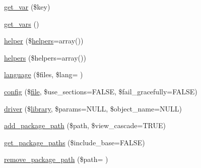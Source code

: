 \begin{DoxyCompactItemize}
\item 
\hyperlink{class_c_i___loader_a06567b423ba6d5b852808e581ef00fb0}{get\+\_\+var} (\$key)
\item 
\hyperlink{class_c_i___loader_aff8505856d4aa461fcb3c0207d6a238f}{get\+\_\+vars} ()
\item 
\hyperlink{class_c_i___loader_a2da00ff269596262b62c0c6032b2996f}{helper} (\$\hyperlink{class_c_i___loader_a2c39d50f31ce66ffe936e4f68219e275}{helpers}=array())
\item 
\hyperlink{class_c_i___loader_a2c39d50f31ce66ffe936e4f68219e275}{helpers} (\$helpers=array())
\item 
\hyperlink{class_c_i___loader_ad7340a297d0f18659129251f8cbada65}{language} (\$files, \$lang= \textquotesingle{}\textquotesingle{})
\item 
\hyperlink{class_c_i___loader_af54799dcb5bf2f7346b5d2a7d824a471}{config} (\$\hyperlink{class_c_i___loader_a47e4b8eda2bbf9e8bb505cdafb8e4ba5}{file}, \$use\+\_\+sections=F\+A\+L\+S\+E, \$fail\+\_\+gracefully=F\+A\+L\+S\+E)
\item 
\hyperlink{class_c_i___loader_ad7ea86a4ca078b6419c7d04827db700b}{driver} (\$\hyperlink{class_c_i___loader_a03207e0bcf58b6c9ecbc09fd2d8eab5d}{library}, \$params=N\+U\+L\+L, \$object\+\_\+name=N\+U\+L\+L)
\item 
\hyperlink{class_c_i___loader_a8b23f3be0a84aa31df8b715ca841f5cf}{add\+\_\+package\+\_\+path} (\$path, \$view\+\_\+cascade=T\+R\+U\+E)
\item 
\hyperlink{class_c_i___loader_a645d5b65ec991d936d864e8af01485e7}{get\+\_\+package\+\_\+paths} (\$include\+\_\+base=F\+A\+L\+S\+E)
\item 
\hyperlink{class_c_i___loader_a9c8ee8f552fff6f4619381ed8f3cec62}{remove\+\_\+package\+\_\+path} (\$path= \textquotesingle{}\textquotesingle{})
\end{DoxyCompactItemize}
